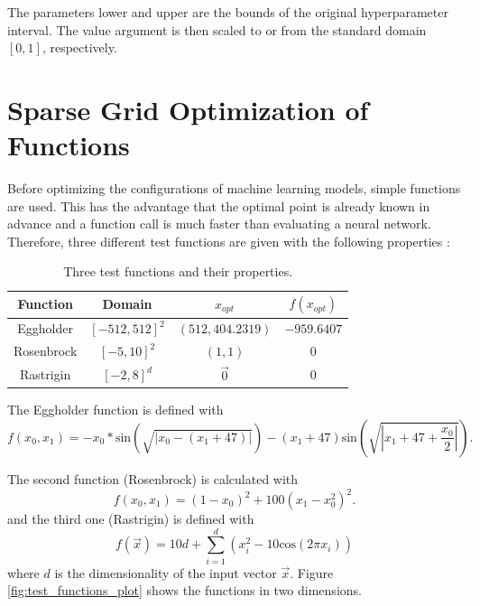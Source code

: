 The parameters lower and upper are the bounds of the original hyperparameter interval. The value argument is then scaled to or from the standard domain $ [0,1] $, respectively.


\section{Sparse Grid Optimization of Functions}

Before optimizing the configurations of machine learning models, simple functions are used. This has the advantage that the optimal point is already known in advance and a function call is much faster than evaluating a neural network. Therefore, three different test functions are given with the following properties \cite{valentin2016hierarchical}:

\begin{table}[htbp!]
	\caption{ Three test functions and their properties.}
	\label{tab:test_functions}
	\centering
	\begin{tabular}{|c c c c|} 
		\hline
		Function & Domain & $x_{opt}$ & $ f(x_{opt}) $\\
		\hline
		Eggholder & $[-512, 512]^2 $ & $(512, 404.2319)$ & $ -959.6407 $ \\
		Rosenbrock & $[-5, 10]^2 $ & $(1,1)$ & $ 0 $ \\
		Rastrigin & $[-2, 8]^d $ & $\vec{0}$ & $ 0 $ \\
		\hline
	\end{tabular}
\end{table}

The Eggholder function is defined with \cite{whitley1996evaluating} 
\begin{equation}
	f(x_0, x_1) = -x_0 * \text{sin}(\sqrt{ | x_0 - (x_1 + 47) | }) - (x_1 + 47) \text{sin}(\sqrt{ | x_1 +47 + \frac{x_0}{2} | }).
\end{equation}

The second function (Rosenbrock) \cite{yang2010engineering} is calculated with 
\begin{equation}
	f(x_0, x_1) = (1-x_0)^2 + 100 (x_1 - x_0^2)^2.
\end{equation} 
and the third one (Rastrigin) \cite{yang2010engineering} is defined with
\begin{equation}
	f(\vec{x}) = 10 d + \sum_{ i = 1 }^{d} (x_i^2 - 10 \text{cos}(2 \pi x_i))
\end{equation} 
where $ d $ is the dimensionality of the input vector $ \vec{x} $. Figure \ref{fig:test_functions_plot} shows the functions in two dimensions.


